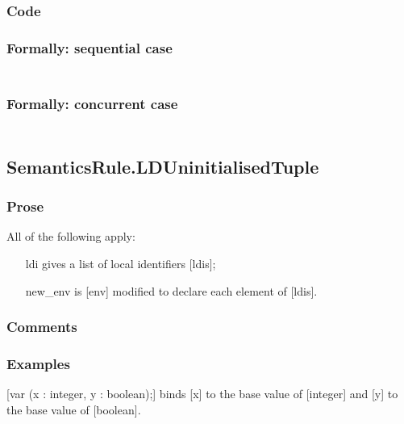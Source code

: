 \documentclass{book}
\begin{document}
  \subsubsection{Code}

  \subsubsection{Formally: sequential case}
  \begin{align}
  \end{align} 

  \subsubsection{Formally: concurrent case}
  \begin{align}
  \end{align} 

\subsection{SemanticsRule.LDUninitialisedTuple \label{sec:SemanticsRule.LDUninitialisedTuple}}

    \subsubsection{Prose}
    All of the following apply:
    \begin{itemize}
    \item [ldi] gives a list of local identifiers [ldis];
    \item [new\_env] is [env] modified to declare each element of [ldis].
    \end{itemize}

    \subsubsection{Comments}

    \subsubsection{Examples}
    [var (x : integer, y : boolean);] binds [x] to the base value of [integer]
    and [y] to the base value of [boolean].
\end{document}
